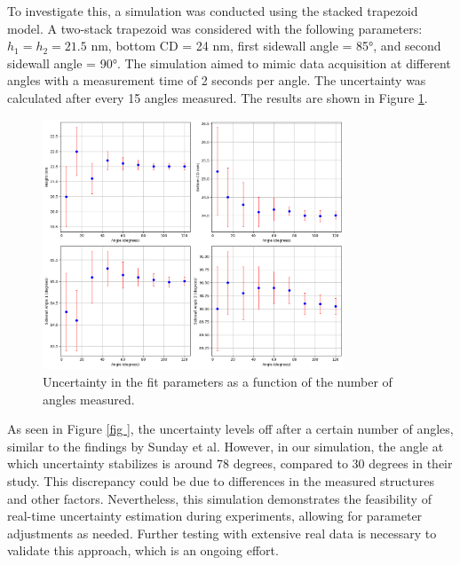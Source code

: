   To investigate this, a simulation was conducted using the stacked trapezoid model. A two-stack 
  trapezoid was considered with the following parameters: \( h_{1} = h_{2} = 21.5 \) nm, bottom CD = 24 nm, 
  first sidewall angle = 85°, and second sidewall angle = 90°. The simulation aimed to mimic 
  data acquisition at different angles with a measurement time of 2 seconds per angle. The uncertainty 
  was calculated after every 15 angles measured. The results are shown in Figure \ref{fig:uncertainity}.

  \begin{figure}[h]
  \centering
  \includegraphics[width=0.8\textwidth]{images/uncertainity.png}
  \caption{Uncertainty in the fit parameters as a function of the number of angles measured.}
  \label{fig:uncertainity}
  \end{figure}
  
  As seen in Figure \ref{fig
  }, the uncertainty levels off after a certain number of angles, similar to the findings by Sunday et al.
   However, in our simulation, the angle at which uncertainty stabilizes is around 78 degrees, 
   compared to 30 degrees in their study. This discrepancy could be due to differences in the measured
structures and other factors. Nevertheless, this simulation demonstrates the feasibility of real-time 
uncertainty estimation during experiments, allowing for parameter adjustments as needed. Further 
testing with extensive real data is necessary to validate this approach, which is an ongoing effort.
